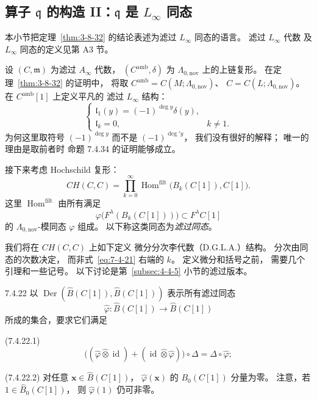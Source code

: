 
\subsection{算子 $\mathfrak q$ 的构造 II：$\mathfrak q$ 是 $L_\infty$ 同态}
\label{subsec:7-4-3}

本小节把定理~\ref{thm:3-8-32}
的结论表述为滤过 $L_\infty$ 同态的语言。%
滤过 $L_\infty$ 代数%
及 $L_\infty$ 同态的定义见第 A3 节。

设 $(C,\mathfrak m)$ 为滤过 $A_\infty$ 代数，
$(C^{\mathrm{amb}},\delta)$ 为
$\Lambda_{0,\mathrm{nov}}$ 上的上链复形。
在定理~\ref{thm:3-8-32} 的证明中，
将取
$C^{\mathrm{amb}}
=C(M;\Lambda_{0,\mathrm{nov}})$、
$C=C(L;\Lambda_{0,\mathrm{nov}})$。
在 $C^{\mathrm{amb}}[1]$ 上定义平凡的
滤过 $L_\infty$ 结构：
\begin{equation}
\begin{cases}
\mathfrak l_1(y)=(-1)^{\deg y}\delta(y),\\
\mathfrak l_k=0, & k\ne1.
\end{cases}
\tag{7.4.20}\label{eq:7-4-20}
\end{equation}
为何这里取符号 $(-1)^{\deg y}$
而不是 $(-1)^{\deg' y}$，
我们没有很好的解释；
唯一的理由是取前者时
命题 7.4.34 的证明能够成立。

接下来考虑 Hochschild 复形：
\begin{equation}
CH(C,C)=\prod_{k=0}^{\infty}
\operatorname{Hom}^{\mathrm{filt}}
\bigl(B_k(C[1]),C[1]\bigr).
\tag{7.4.21}\label{eq:7-4-21}
\end{equation}
这里 $\operatorname{Hom}^{\mathrm{filt}}$
由所有满足
\[
\varphi\bigl(F^\lambda(B_k(C[1]))\bigr)
\subset F^\lambda C[1]
\]
的 $\Lambda_{0,\mathrm{nov}}$-模同态
$\varphi$ 组成。
以下称这类同态为\emph{滤过同态}。

我们将在 $CH(C,C)$ 上如下定义
微分分次李代数（D.G.L.A.）结构。
分次由同态的次数决定，
而非式~\eqref{eq:7-4-21} 右端的 $k$。
定义微分和括号之前，
需要几个引理和一些记号。
以下讨论是第~\ref{subsec:4-4-5} 小节的滤过版本。

\begin{definition}{7.4.22}\label{def:7-4-22}
以
$\operatorname{Der}
(\widehat B(C[1]),\widehat B(C[1]))$
表示所有滤过同态
\[
\widehat\varphi:
\widehat B(C[1])\longrightarrow
\widehat B(C[1])
\]
所成的集合，要求它们满足

\par\noindent\textup{(7.4.22.1)}\label{cond:7-4-22-1}\quad
\[
\bigl((\widehat\varphi\widehat\otimes
\operatorname{id})
+(\operatorname{id}\widehat\otimes
\widehat\varphi)\bigr)\circ\Delta
=\Delta\circ\widehat\varphi;
\]

\par\noindent\textup{(7.4.22.2)}\label{cond:7-4-22-2}\quad
对任意
$\mathbf x\in\widehat B(C[1])$，
$\widehat\varphi(\mathbf x)$ 的
$B_0(C[1])$ 分量为零。
注意，若
$1\in\widehat B_0(C[1])$，
则 $\widehat\varphi(1)$ 仍可非零。
\end{definition}

